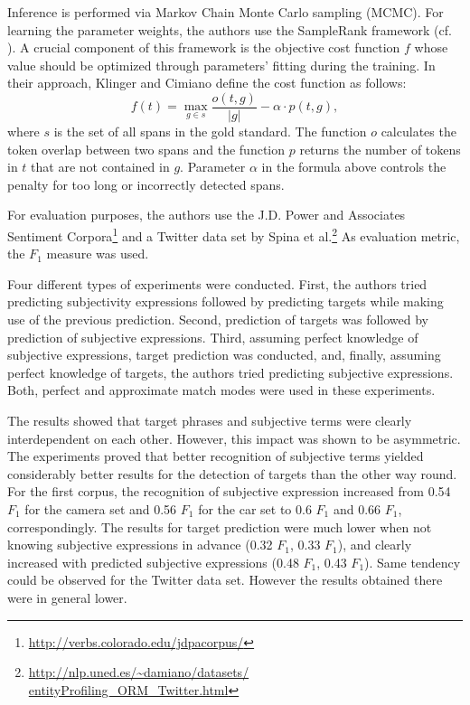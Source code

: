 \documentclass[a4paper,11pt]{article}
\begin{document}
Inference is performed via Markov Chain Monte Carlo sampling (MCMC).  For
learning the parameter weights, the authors use the SampleRank framework
(cf. \cite{Wick-11}).  A crucial component of this framework is the objective
cost function $f$ whose value should be optimized through parameters' fitting
during the training.  In their approach, Klinger and Cimiano define the cost
function as follows:
\begin{equation}
  f(t) = \max_{g \in s}\frac{o(t, g)}{|g|} - \alpha \cdot p(t, g),
\end{equation}
where $s$ is the set of all spans in the gold standard.  The function $o$
calculates the token overlap between two spans and the function $p$ returns
the number of tokens in $t$ that are not contained in $g$.  Parameter $\alpha$
in the formula above controls the penalty for too long or incorrectly detected
spans.

For evaluation purposes, the authors use the J.D. Power and Associates
Sentiment Corpora\footnote{\url{http://verbs.colorado.edu/jdpacorpus/}} and a
Twitter data set by Spina et
al.\footnote{\url{http://nlp.uned.es/~damiano/datasets/
    entityProfiling_ORM_Twitter.html}} As evaluation metric, the $F_1$ measure
was used.

Four different types of experiments were conducted.  First, the authors tried
predicting subjectivity expressions followed by predicting targets while
making use of the previous prediction.  Second, prediction of targets was
followed by prediction of subjective expressions.  Third, assuming perfect
knowledge of subjective expressions, target prediction was conducted, and,
finally, assuming perfect knowledge of targets, the authors tried predicting
subjective expressions.  Both, perfect and approximate match modes were used
in these experiments.

The results showed that target phrases and subjective terms were clearly
interdependent on each other.  However, this impact was shown to be
asymmetric.  The experiments proved that better recognition of subjective
terms yielded considerably better results for the detection of targets than
the other way round.  For the first corpus, the recognition of subjective
expression increased from 0.54 $F_1$ for the camera set and 0.56 $F_1$ for the
car set to 0.6 $F_1$ and 0.66 $F_1$, correspondingly. The results for target
prediction were much lower when not knowing subjective expressions in advance
(0.32 $F_1$, 0.33 $F_1$), and clearly increased with predicted subjective
expressions (0.48 $F_1$, 0.43 $F_1$).  Same tendency could be observed for the
Twitter data set.  However the results obtained there were in general lower.
\end{document}
